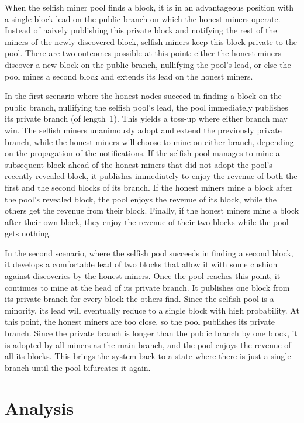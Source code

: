 \documentclass[letterpaper]{llncs}
\begin{document}
When the selfish miner pool finds a block, it is in an advantageous position with a single block lead on the public branch on which the honest miners operate. Instead of naively publishing this private block and notifying the rest of the miners of the newly discovered block, selfish miners keep this block private to the pool. There are two outcomes possible at this point: either the honest miners discover a new block on the public branch, nullifying the pool's lead, or else the pool mines a second block and extends its lead on the honest miners. 

In the first scenario where the honest nodes succeed in finding a block on the public branch, nullifying the selfish pool's lead, the pool immediately publishes its private branch (of length~1). This yields a toss-up where either branch may win. The selfish miners unanimously adopt and extend the previously private branch, while the honest miners will choose to mine on either branch, depending on the propagation of the notifications. If the selfish pool manages to mine a subsequent block ahead of the honest miners that did not adopt the pool's recently revealed block, it publishes immediately to enjoy the revenue of both the first and the second blocks of its branch. 
If the honest miners mine a block after the pool's revealed block, the pool enjoys the revenue of its block, while the others get the revenue from their block. Finally, if the honest miners mine a block after their own block, they enjoy the revenue of their two blocks while the pool gets nothing. 

In the second scenario, where the selfish pool succeeds in finding a second block, it develops a comfortable lead of two blocks that allow it with some cushion against discoveries by the honest miners. 
Once the pool reaches this point, it continues to mine at the head of its private branch. It publishes one block from its private branch for every block the others find. Since the selfish pool is a minority, its lead will eventually reduce to a single block with high probability. 
At this point, the honest miners are too close, so the pool publishes its private branch. Since the private branch is longer than the public branch by one block, it is adopted by all miners as the main branch, and the pool enjoys the revenue of all its blocks. This brings the system back to a state where there is just a single branch until the pool bifurcates it again. 



    \section{Analysis} \label{sec:analysis} 
\end{document}
